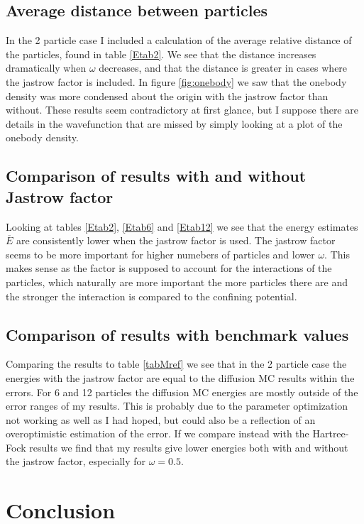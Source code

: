 \documentclass[a4paper,English,10pt]{article}
\renewcommand{\bar}{\overline}
\begin{document}
\subsection{Average distance between particles}
In the 2 particle case I included a calculation of the average relative distance of the particles, found in table \ref{Etab2}.
We see that the distance increases dramatically when $\omega$ decreases, and that the distance is greater in cases where the jastrow factor is included.
In figure \ref{fig:onebody} we saw that the onebody density was more condensed about the origin with the jastrow factor than without. These results seem
contradictory at first glance, but I suppose there are details in the wavefunction that are missed by simply looking at a plot of the onebody density.

\subsection{Comparison of results with and without Jastrow factor}
Looking at tables \ref{Etab2}, \ref{Etab6} and \ref{Etab12} we see that the energy estimates $\bar{E}$ are consistently lower when the jastrow factor is used.
The jastrow factor seems to be more important for higher numebers of particles and lower $\omega$. This makes sense as the factor is supposed to account for the interactions
of the particles, which naturally are more important the more particles there are and the stronger the interaction is compared to the confining potential.

\subsection{Comparison of results with benchmark values}
Comparing the results to table \ref{tabMref} we see that in the 2 particle case the energies with the jastrow factor are equal to the diffusion MC results within the errors.
For 6 and 12 particles the diffusion MC energies are mostly outside of the error ranges of my results. This is probably due to the parameter optimization not working as well
as I had hoped, but could also be a reflection of an overoptimistic estimation of the error. If we compare instead with the Hartree-Fock results we find that my results
give lower energies both with and without the jastrow factor, especially for $\omega = 0.5$.

\section{Conclusion}
\end{document}

